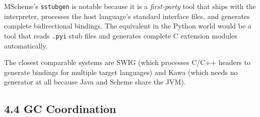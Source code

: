 \documentclass[
  12pt,
]{report}
\newcommand{\passthrough}[1]{#1}
\begin{document}
MScheme's \passthrough{\lstinline!sstubgen!} is notable because it is a
\emph{first-party} tool that ships with the interpreter, processes the
host language's standard interface files, and generates complete
bidirectional bindings. The equivalent in the Python world would be a
tool that reads \passthrough{\lstinline!.pyi!} stub files and generates
complete C extension modules automatically.

The closest comparable systems are SWIG (which processes C/C++ headers
to generate bindings for multiple target languages) and Kawa (which
needs no generator at all because Java and Scheme share the JVM).

\subsection{4.4 GC Coordination}\label{gc-coordination}
\end{document}
